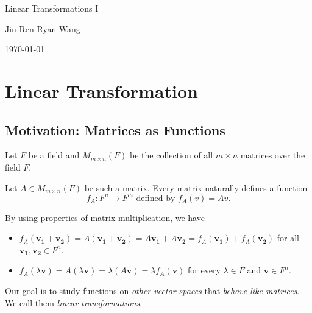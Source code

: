 \documentclass[12pt]{article}
\begin{document}
\begin{titlepage}
    \centering

    \vspace*{\fill}

    {\Huge Linear Transformations I}

    \vspace{1cm}

    {\Large Jin-Ren Ryan Wang\par}

    \vspace{0.5cm}

    {\large \today\par}

    \vspace*{\fill}
\end{titlepage}

\tableofcontents

\newpage

\section{Linear Transformation}

\subsection{Motivation: Matrices as Functions}

Let $F$ be a field and $M_{m\times n}(F)$ be the collection of all $m\times n$ matrices over the field $F$.

Let $A\in M_{m\times n}(F)$ be such a matrix. Every matrix naturally defines a function
\[
f_A:F^n\rightarrow F^m \text{ defined by } f_A(v)=Av.
\]

By using properties of matrix multiplication, we have

\begin{itemize}
    \item $f_A(\mathbf{v_1+v_2})=A(\mathbf{v_1+v_2})=A\mathbf{v_1}+A\mathbf{v_2}=f_A(\mathbf{v_1})+f_A(\mathbf{v_2})$ for all $\mathbf{v_1,v_2}\in F^n$.
    \item $f_A(\lambda \mathbf{v})=A(\lambda \mathbf{v})=\lambda(A\mathbf{v})=\lambda f_A(\mathbf{v})$ for every $\lambda\in F$ and $\mathbf{v}\in F^n$.
\end{itemize}

Our goal is to study functions on \emph{other vector spaces} that \emph{behave like matrices}.\\
We call them \emph{linear transformations}.
\end{document}
